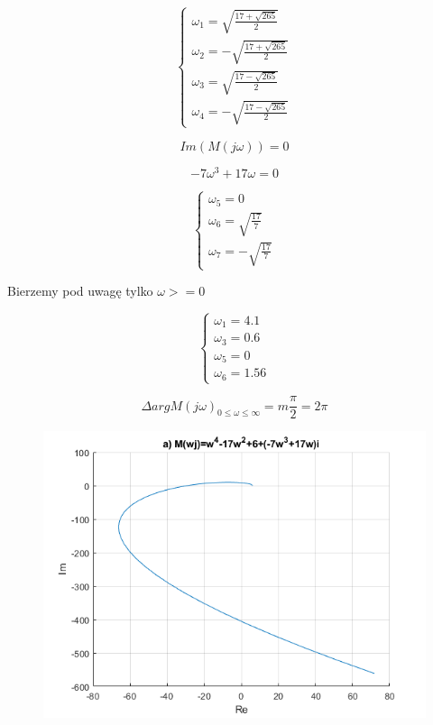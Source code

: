 \documentclass{article}
\begin{document}
\begin{itemize}
    \[\begin{cases}
        \omega_{1}=\sqrt{\frac{17+\sqrt{265}}{2}}
        \\
        \omega_{2}=-\sqrt{\frac{17+\sqrt{265}}{2}}
        \\
        \omega_{3}=\sqrt{\frac{17-\sqrt{265}}{2}}
        \\
        \omega_{4}=-\sqrt{\frac{17-\sqrt{265}}{2}}
    \end{cases}\]

    $$Im(M(j\omega))=0$$

    $$ -7\omega^{3}+17\omega=0 $$

    \[\begin{cases}
        \omega_{5}=0\\
        \omega_{6}=\sqrt{\frac{17}{7}}\\
        \omega_{7}=-\sqrt{\frac{17}{7}}
    \end{cases}\]

    Bierzemy pod uwagę tylko $\omega>=0$

    \[\begin{cases}
        \omega_{1}=4.1\\
        \omega_{3}=0.6\\
        \omega_{5}=0\\
        \omega_{6}=1.56
    \end{cases}\]

    $$\Delta argM(j\omega)_{0\leq \omega \le \infty }=m\frac{\pi}{2}=2\pi$$

    \begin{figure}[h!]
        \includegraphics[scale=0.5]{a.png}
        \centering
    \end{figure}


\end{itemize}
\end{document}
